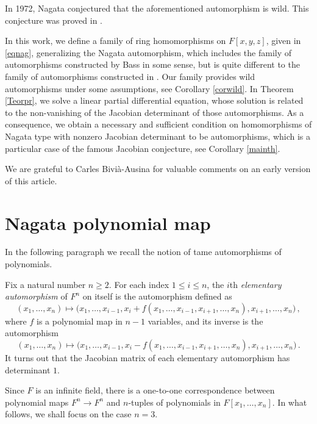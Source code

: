 \documentclass{amsart}
\begin{document}
In 1972, Nagata conjectured that the aforementioned automorphism is wild. This conjecture was proved in \cite[Corollary 9]{SU04}.


In this work, we define a family of ring homomorphisms on $F[x,y,z]$, given in \eqref{eqnag}, generalizing the Nagata automorphism, which includes the family of automorphisms constructed by Bass \cite{Bass84} in some sense, but is quite different to the family of automorphisms constructed in \cite[(1)]{Kur14}. Our family provides wild automorphisms under some assumptions, see Corollary \ref{corwild}. In Theorem \ref{Teorpr}, we solve a linear partial differential equation, whose solution is related to the non-vanishing of the Jacobian determinant of those automorphisms. As a consequence, we obtain a necessary and sufficient condition on homomorphisms of Nagata type  with nonzero Jacobian determinant to be automorphisms, which is a particular case of the famous Jacobian conjecture, see  Corollary \ref{mainth}. 




\bigskip

 We are grateful to Carles Bivià-Ausina for valuable comments on an early version of this article. 

\section{Nagata polynomial map}
In the following paragraph we recall the notion of tame automorphisms of polynomials.  

Fix a natural number $n\geq 2$. For each index $1\leq i\leq n$, the $i$th {\em elementary automorphism} of $F^n$ on itself is the automorphism defined as 
$$(x_1,\dots,x_n)\mapsto\Big(x_1,\dots, x_{i-1}, x_i+f(x_1,\dots,x_{i-1},x_{i+1},\dots,x_n), x_{i+1},\dots,x_n\Big)\,,$$
where $f$ is a polynomial map in $n-1$ variables, and its inverse is the automorphism 
$$(x_1,\dots,x_n)\mapsto\Big(x_1,\dots, x_{i-1}, x_i-f(x_1,\dots,x_{i-1},x_{i+1},\dots,x_n), x_{i+1},\dots,x_n\Big)\,.$$
It turns out that the Jacobian matrix of each elementary automorphism has determinant $1$. 

Since $F$ is an infinite field, there is a one-to-one correspondence between polynomial maps $F^n\to F^n$ and  $n$-tuples of polynomials in $F[x_1,\dots,x_n]$.   
In what follows, we shall focus on the case $n=3$.  
\end{document}
